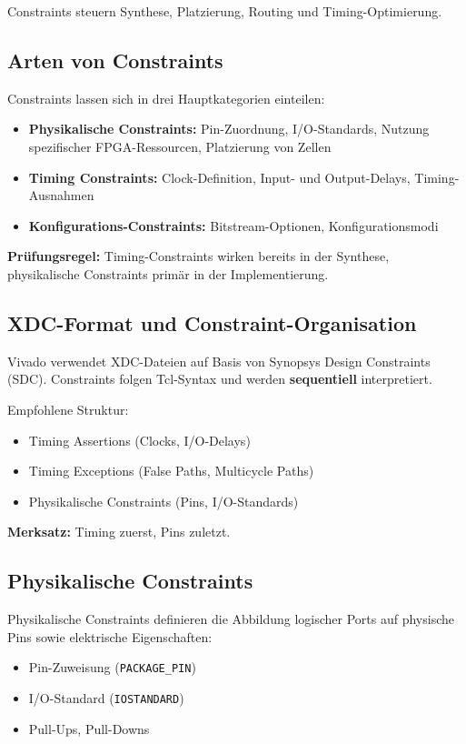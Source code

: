 \documentclass[11pt,a4paper]{article}
\newcommand{\hilite}[1]{\colorbox{yellow!25}{#1}}
\newcommand{\imp}[1]{\textbf{\textcolor{codeemph}{#1}}}
\begin{document}
Constraints steuern Synthese, Platzierung, Routing und Timing-Optimierung.

\subsection{Arten von Constraints}
Constraints lassen sich in drei Hauptkategorien einteilen:
\begin{itemize}
  \item \textbf{Physikalische Constraints:} Pin-Zuordnung, I/O-Standards, Nutzung spezifischer FPGA-Ressourcen, Platzierung von Zellen
  \item \textbf{Timing Constraints:} Clock-Definition, Input- und Output-Delays, Timing-Ausnahmen
  \item \textbf{Konfigurations-Constraints:} Bitstream-Optionen, Konfigurationsmodi
\end{itemize}

\imp{Prüfungsregel:}  
\hilite{Timing}-\hilite{Constraints} \hilite{wirken} bereits in der Synthese, physikalische Constraints primär in der Implementierung.

\subsection{XDC-Format und Constraint-Organisation}
Vivado verwendet XDC-Dateien auf Basis von Synopsys Design Constraints (SDC).  
Constraints folgen Tcl-Syntax und werden \textbf{sequentiell} interpretiert.

Empfohlene Struktur:
\begin{itemize}
  \item Timing Assertions (Clocks, I/O-Delays)
  \item Timing Exceptions (False Paths, Multicycle Paths)
  \item Physikalische Constraints (Pins, I/O-Standards)
\end{itemize}

\textbf{Merksatz:}  
\hilite{Timing zuerst, Pins zuletzt.}

\subsection{Physikalische Constraints}
Physikalische Constraints definieren die Abbildung logischer Ports auf physische Pins sowie elektrische Eigenschaften:
\begin{itemize}
  \item Pin-Zuweisung (\texttt{PACKAGE\_PIN})
  \item I/O-Standard (\texttt{IOSTANDARD})
  \item Pull-Ups, Pull-Downs
\end{itemize}
\end{document}
